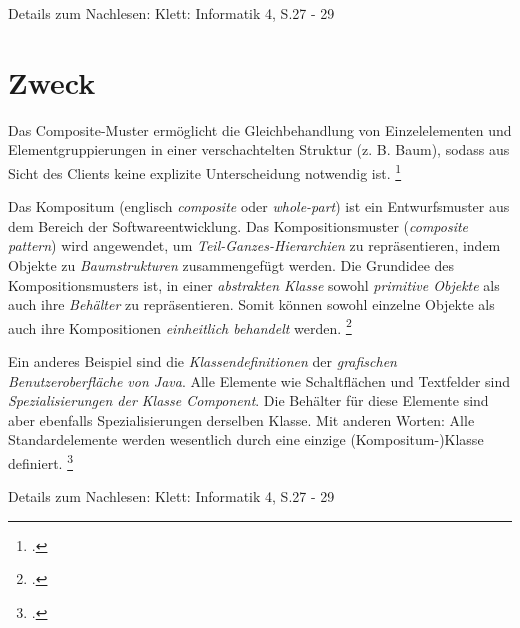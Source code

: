 \documentclass{lehramt-informatik-haupt}
\begin{document}
Details zum Nachlesen: Klett: Informatik 4, S.27 - 29

\section{Zweck}

Das Composite-Muster ermöglicht die Gleichbehandlung von Einzelelementen
und Elementgruppierungen in einer verschachtelten Struktur (z. B. Baum),
sodass aus Sicht des Clients keine explizite Unterscheidung notwendig
ist.
\footcite[Seite 102]{eilebrecht}

%

Das Kompositum (englisch \emph{composite} oder \emph{whole-part}) ist
ein Entwurfsmuster aus dem Bereich der Softwareentwicklung. Das
Kompositionsmuster (\emph{composite pattern}) wird angewendet, um
\emph{Teil-Ganzes-Hierarchien} zu repräsentieren, indem Objekte zu
\emph{Baumstrukturen} zusammengefügt werden. Die Grundidee des
Kompositionsmusters ist, in einer \emph{abstrakten Klasse} sowohl
\emph{primitive Objekte} als auch ihre \emph{Behälter} zu
repräsentieren. Somit können sowohl einzelne Objekte als auch ihre
Kompositionen \emph{einheitlich behandelt} werden.
\footcite{aud:fs:4}

Ein anderes Beispiel sind die \emph{Klassendefinitionen} der
\emph{grafischen Benutzeroberfläche von Java}. Alle Elemente wie
Schaltflächen und Textfelder sind \emph{Spezialisierungen der Klasse
Component}. Die Behälter für diese Elemente sind aber ebenfalls
Spezialisierungen derselben Klasse. Mit anderen Worten: Alle
Standardelemente werden wesentlich durch eine einzige
(Kompositum-)Klasse definiert.
\footcite{wiki:kompositum}

\begin{center}
\end{center}

Details zum Nachlesen: Klett: Informatik 4, S.27 - 29

\literatur
\end{document}
